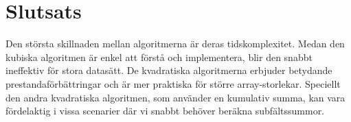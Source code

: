 \documentclass{article}
\begin{document}
\section{Slutsats}
Den största skillnaden mellan algoritmerna är deras tidskomplexitet. Medan den kubiska algoritmen är enkel att förstå och implementera, blir den snabbt ineffektiv för stora datasätt. De kvadratiska algoritmerna erbjuder betydande prestandaförbättringar och är mer praktiska för större array-storlekar. Speciellt den andra kvadratiska algoritmen, som använder en kumulativ summa, kan vara fördelaktig i vissa scenarier där vi snabbt behöver beräkna subfältssummor.
\end{document}
